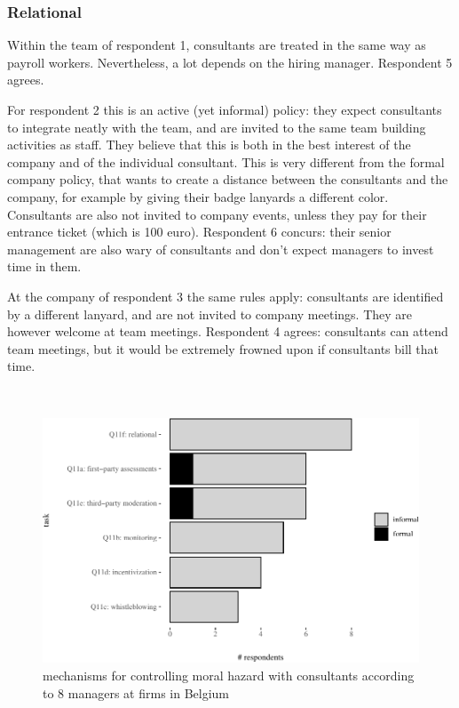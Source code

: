 \documentclass[
  man,floatsintext]{apa6}
\begin{document}
\subsubsection{Relational}\label{relational-1}

Within the team of respondent 1, consultants are treated in the same way as payroll workers. Nevertheless, a lot depends on the hiring manager. Respondent 5 agrees.

For respondent 2 this is an active (yet informal) policy: they expect consultants to integrate neatly with the team, and are invited to the same team building activities as staff. They believe that this is both in the best interest of the company and of the individual consultant. This is very different from the formal company policy, that wants to create a distance between the consultants and the company, for example by giving their badge lanyards a different color. Consultants are also not invited to company events, unless they pay for their entrance ticket (which is 100 euro). Respondent 6 concurs: their senior management are also wary of consultants and don't expect managers to invest time in them.

At the company of respondent 3 the same rules apply: consultants are identified by a different lanyard, and are not invited to company meetings. They are however welcome at team meetings. Respondent 4 agrees: consultants can attend team meetings, but it would be extremely frowned upon if consultants bill that time.

\(~\)

\begin{figure}

{\centering \includegraphics[width=0.75\linewidth]{2_ams_five_pager_files/figure-latex/unnamed-chunk-8-1} 

}

\caption{mechanisms for controlling moral hazard with consultants according to 8 managers at firms in Belgium}\label{fig:unnamed-chunk-8}
\end{figure}
\end{document}
